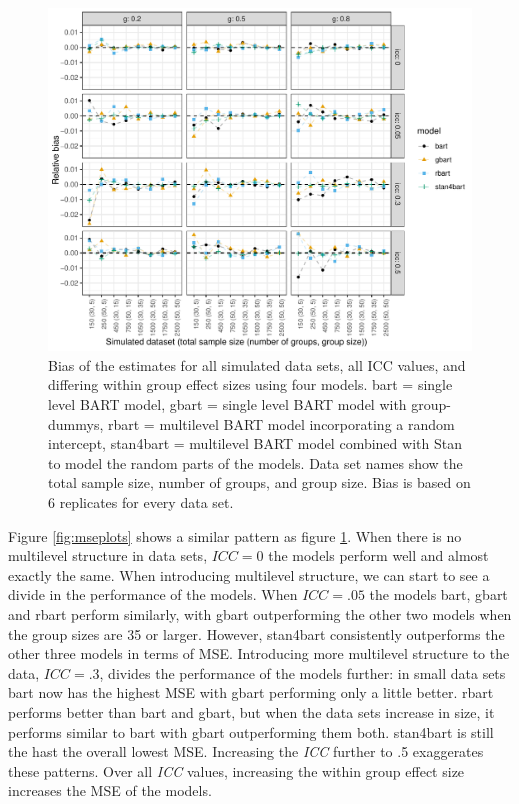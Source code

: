 \documentclass[10pt, a4paper, titlepage]{article}
\begin{document}
\begin{figure}[H]
\caption{Bias of the estimates for all simulated data sets, all ICC values, and differing within group effect sizes using four models. bart = single level BART model, gbart = single level BART model with group-dummys, rbart = multilevel BART model incorporating a random intercept, stan4bart = multilevel BART model combined with Stan to model the random parts of the models. Data set names show the total sample size, number of groups, and group size. Bias is based on 6 replicates for every data set.}
\centering
\label{fig:biasplots}
\includegraphics[width=\textwidth]{biasplots4.pdf}
\end{figure}

Figure \ref{fig:mseplots} shows a similar pattern as figure \ref{fig:biasplots}. When there is no multilevel structure in data sets, $ICC = 0$ the models perform well and almost exactly the same. When introducing multilevel structure, we can start to see a divide in the performance of the models. When $ICC = .05$ the models bart, gbart and rbart perform similarly, with gbart outperforming the other two models when the group sizes are 35 or larger. However, stan4bart consistently outperforms the other three models in terms of MSE. Introducing more multilevel structure to the data, $ICC = .3$, divides the performance of the models further: in small data sets bart now has the highest MSE with gbart performing only a little better. rbart performs better than bart and gbart, but when the data sets increase in size, it performs similar to bart with gbart outperforming them both. stan4bart is still the hast the overall lowest MSE. Increasing the \textit{ICC} further to .5 exaggerates these patterns. Over all \textit{ICC} values, increasing the within group effect size increases the MSE of the models.
\end{document}
